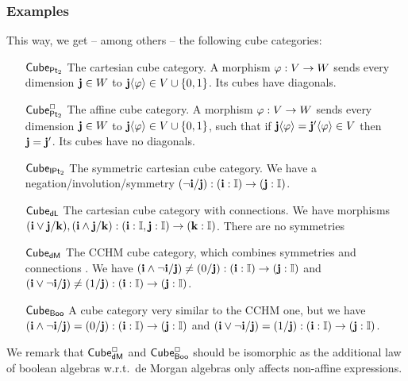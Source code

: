 \documentclass[a4paper]{article}
\begin{document}
\subsubsection{Examples}
This way, we get -- among others -- the following cube categories:
\begin{enumerate}
	\item[${\mathsf{Cube}}_{{\mathsf{Pt}_2}}$] The cartesian cube category.
	A morphism $\varphi : V \to W$ sends every dimension $\mathbf{j} \in W$ to $\mathbf{j} \langle \varphi \rangle \in V \cup \mathopen{}\left\{ 0, 1 \right\}\mathclose{}$.
	Its cubes have diagonals.
	\item[${\mathsf{Cube}}^\Box_{{\mathsf{Pt}_2}}$] The affine cube category.
	A morphism $\varphi : V \to W$ sends every dimension $\mathbf{j} \in W$ to $\mathbf{j} \langle \varphi \rangle \in V \cup \mathopen{}\left\{ 0, 1 \right\}\mathclose{}$, such that if $\mathbf{j}\langle \varphi \rangle = \mathbf{j}' \langle \varphi \rangle \in V$ then $\mathbf{j} = \mathbf{j}'$.
	Its cubes have no diagonals.
	\item[${\mathsf{Cube}}_{{\mathsf{IPt}_2}}$] The symmetric cartesian cube category. We have a negation/involution/symmetry $(\lnot \mathbf{i} / \mathbf{j}) : (\mathbf{i} : {\mathbb I}) \to (\mathbf{j} : {\mathbb I})$.
	\item[${\mathsf{Cube}}_{\mathsf{dL}}$] The cartesian cube category with connections. We have morphisms $(\mathbf{i} \vee \mathbf{j} / \mathbf{k}), (\mathbf{i} \wedge \mathbf{j} / \mathbf{k}) : (\mathbf{i} : {\mathbb I}, \mathbf{j} : {\mathbb I}) \to (\mathbf{k} : {\mathbb I})$. There are no symmetries
	\item[${\mathsf{Cube}}_{\mathsf{dM}}$] The CCHM cube category, which combines symmetries and connections \cite{cubical}. We have $(\mathbf{i} \wedge \lnot \mathbf{i} / \mathbf{j}) \neq (0/\mathbf{j}) : (\mathbf{i} : {\mathbb I}) \to (\mathbf{j} : {\mathbb I})$ and $(\mathbf{i} \vee \lnot \mathbf{i} / \mathbf{j}) \neq (1/\mathbf{j}) : (\mathbf{i} : {\mathbb I}) \to (\mathbf{j} : {\mathbb I})$.
	\item[${\mathsf{Cube}}_{\mathsf{Boo}}$] A cube category very similar to the CCHM one, but we have $(\mathbf{i} \wedge \lnot \mathbf{i} / \mathbf{j}) = (0/\mathbf{j}) : (\mathbf{i} : {\mathbb I}) \to (\mathbf{j} : {\mathbb I})$ and $(\mathbf{i} \vee \lnot \mathbf{i} / \mathbf{j}) = (1/\mathbf{j}) : (\mathbf{i} : {\mathbb I}) \to (\mathbf{j} : {\mathbb I})$.
\end{enumerate}
We remark that ${\mathsf{Cube}}^\Box_{\mathsf{dM}}$ and ${\mathsf{Cube}}^\Box_{\mathsf{Boo}}$ should be isomorphic as the additional law of boolean algebras w.r.t.\ de Morgan algebras only affects non-affine expressions.

\end{document}
